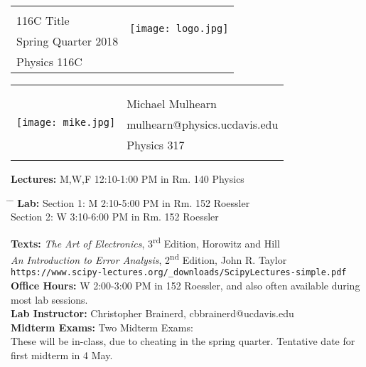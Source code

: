 \documentclass[12pt]{article}
\begin{document}
\begin{tabular*}{\textwidth}{l @{\extracolsep{\fill}} r}
  & \multirow{3}{*}{\texttt{[image: logo.jpg]}} \\
  \large 116C Title & \\
  \large Spring Quarter 2018 & \\
  \large Physics 116C & \\
\end{tabular*}
\vspace{10mm}

\begin{tabular}{ l l }
  \multirow{6}{*}{\texttt{[image: mike.jpg]}} & \\
  & \\
  & \large Michael Mulhearn \\
  & \large mulhearn@physics.ucdavis.edu \\
  & \large Physics 317 \\
  & \\
\end{tabular}
\vskip 0.5cm
\noindent
\textbf {Lectures:} M,W,F 12:10-1:00 PM in Rm. 140 Physics
\begin{tabbing}
\hspace*{3em}\= \hspace*{5em} \= \kill %
\textbf {Lab:}    \> Section 1: \>  M 2:10-5:00 PM in Rm. 152 Roessler \\
                        \> Section 2: \> W 3:10-6:00 PM in Rm. 152 Roessler \\
\end{tabbing}

\noindent
\textbf {Texts:} \emph{The Art of Electronics}, 3\textsuperscript{rd} Edition, Horowitz and Hill\\
\emph{An Introduction to Error Analysis}, 2\textsuperscript{nd} Edition, John R. Taylor\\
{\tt https://www.scipy-lectures.org/\_downloads/ScipyLectures-simple.pdf} \\
\noindent
\textbf{Office Hours:} W 2:00-3:00 PM in 152 Roessler, and also often available during most lab sessions.\\
\noindent
\textbf{Lab Instructor:} Christopher Brainerd, cbbrainerd@ucdavis.edu \\
\noindent
\textbf{Midterm Exams:} Two Midterm Exams:  \\ 
These will be in-class, due to cheating in the spring quarter.  Tentative date for first midterm in 4 May.\\
\end{document}
